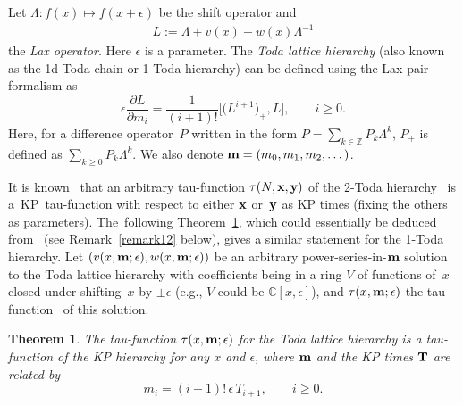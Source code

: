 \documentclass[11pt]{article}
\numberwithin{equation}{section}
\newcommand{\e}{\epsilon}
\newcommand{\ZZ}{\mathbb{Z}}
\newcommand{\p}{\partial}
\newcommand{\be}{\begin{equation}}
\newcommand{\beq}{\begin{equation}}
\newcommand{\ee}{\end{equation}}
\newcommand{\eeq}{\end{equation}}
\numberwithin{equation}{section}
\newtheorem{Theorem}{Theorem}[section]
\begin{document}
Let $\Lambda\colon f(x)\mapsto f(x+\e)$ be the shift operator and
\begin{gather*}%
L := \Lambda + v(x) + w(x) \Lambda^{-1}
\end{gather*}
the {\it Lax operator}. Here $\e$ is a parameter.
The {\it Toda lattice hierarchy} (also known as the 1d Toda chain or 1-Toda hierarchy)
can be defined using the Lax pair formalism as
\beq\label{TLH}
\e\frac{\p L}{\p m_i} = \frac1{(i+1)!} \bigl[\bigl(L^{i+1}\bigr)_+,L\bigr], \qquad i\geq0.
\eeq
Here, for a difference operator~$P$ written in the form $P=\sum_{k\in \ZZ} P_k \Lambda^k$,
$P_+$ is defined as $\sum_{k\geq0} P_k \Lambda^k$. We also denote ${\bf m}=(m_0,m_1,m_2,\dots)$.

It is known~\cite{UT} that an arbitrary tau-function $\tau(N,{\bf x},{\bf y})$ of the 2-Toda hierarchy~\cite{UT}
is a~KP~tau-function with respect to either ${\bf x}$ or~${\bf y}$ as KP times (fixing the others
as parameters). The~following Theorem~\ref{thm:toda-kp},
which could essentially be deduced from~\cite{UT} (see Remark~\ref{remark12} below), gives a similar statement for the 1-Toda hierarchy. Let $(v(x,{\bf m};\e), w(x,{\bf m};\e))$ be an arbitrary power-series-in-${\bf m}$ solution
to the Toda lattice hierarchy
with coefficients being in a ring $V$ of functions of~$x$ closed under shifting~$x$
by $\pm \e$ (e.g., $V$ could be $\mathbb{C}[x,\e]$),
and $\tau(x,{\bf m};\e)$ the tau-function~\cite{DY} of this solution.
\begin{Theorem} \label{thm:toda-kp}
The tau-function $\tau(x,{\bf m};\e)$ for the Toda lattice hierarchy
is a tau-function of the KP hierarchy for any $x$ and $\e$,
where ${\bf m}$ and the KP times ${\bf T}$ are related by
\be\label{tT30}
m_i = (i+1)! \, \e \, T_{i+1},\qquad i\ge0.
\ee
\end{Theorem}
\end{document}
